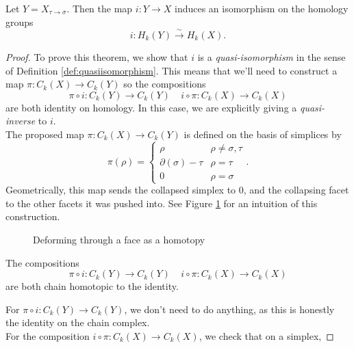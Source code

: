 \begin{theorem}
Let $Y=X_{\tau\to \sigma}$. Then the map $i: Y\to X$ induces an isomorphism on the homology groups 
\[i:H_k(Y)\xrightarrow{\sim}  H_k(X).\] 
\end{theorem}
\begin{proof}
To prove this theorem, we show that $i$ is a \emph{quasi-isomorphism} in the sense of Definition \ref{def:quasiisomorphism}. This means that we'll need to construct a map $\pi: C_k(X)\to C_k(Y)$ so the compositions 
\[ \pi \circ i: C_k(Y)\to C_k(Y) \;\;\;\; i\circ \pi: C_k(X)\to C_k(X)\]
are both identity on homology. In this case, we are explicitly giving a \emph{quasi-inverse} to $i$. \\
The proposed map $\pi: C_k(X)\to C_k(Y)$ is defined on the basis of simplices by 
\[\pi(\rho)=\left\{ \begin{array}{ll} \rho & \rho \neq \sigma, \tau\\ \partial(\sigma)-\tau & \rho = \tau \\
0 & \rho = \sigma \end{array} \right. .\]
Geometrically, this map sends the collapsed simplex to 0, and the collapsing facet to the other facets it was pushed into. See Figure \ref{fig:collapsinghomotopy} for an intuition of this construction. 
\begin{figure}
\centering
{}
\caption{Deforming through a face as a homotopy}
\label{fig:collapsinghomotopy}
\end{figure}
\begin{lemma}
The compositions \[ \pi \circ i: C_k(Y)\to C_k(Y) \;\;\;\; i\circ \pi: C_k(X)\to C_k(X)\] are both chain homotopic to the identity. 
\end{lemma}
For $\pi \circ i: C_k(Y)\to C_k(Y)$, we don't need to do anything, as this is honestly the identity on the chain complex. \\
For the composition $i\circ \pi: C_k(X)\to C_k(X)$, we check that on a simplex, 

\end{proof}
